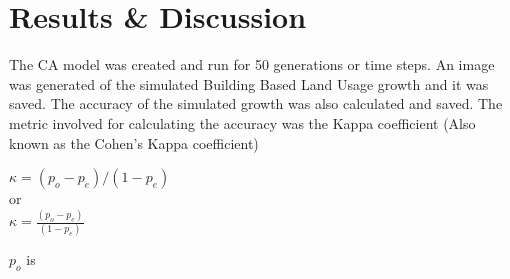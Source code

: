 \chapter{Results \& Discussion} %
The CA model was created and run for 50 generations or time steps. An image was generated of the simulated Building Based Land Usage growth and it was saved. The accuracy of the simulated growth was also calculated and saved. The metric involved for calculating the accuracy  was the Kappa coefficient (Also known as the Cohen's Kappa coefficient)
\begin{center}
$\kappa = (p_o - p_e) / (1 - p_e)$\\
or\\
$\kappa = \frac{(p_o - p_e)}{(1 - p_e)}$
\end{center}
$p_o$ is 

